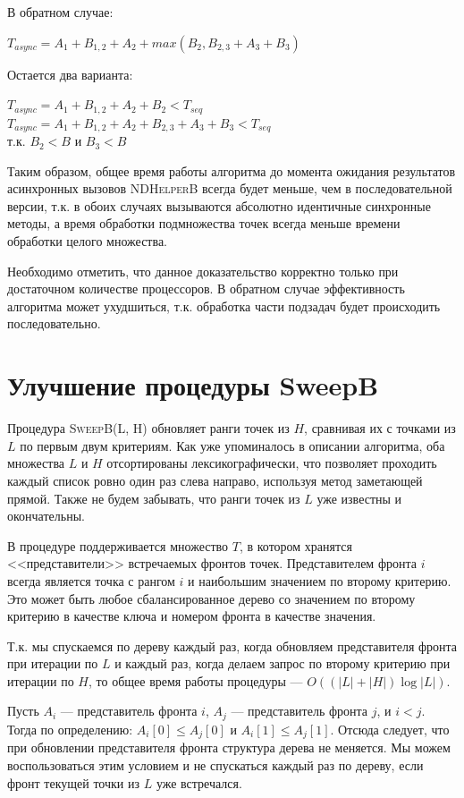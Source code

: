 В обратном случае:
\begin{center}
    $T_{async} = A_1 + B_{1,2} + A_2 + max(B_2, B_{2,3} + A_3 + B_3)$
\end{center}

Остается два варианта:
\begin{center}
    $T_{async} = A_1 + B_{1,2} + A_2 + B_2 < T_{seq}$\\
    $T_{async} = A_1 + B_{1,2} + A_2 + B_{2,3} + A_3 + B_3 < T_{seq}$\\
    т.к. $B_2 < B$ и $B_3 < B$
\end{center}

Таким образом, общее время работы алгоритма до момента ожидания результатов асинхронных вызовов \textsc{NDHelperB} всегда будет меньше, чем в последовательной версии, т.к. в обоих случаях вызываются абсолютно идентичные синхронные методы, а время обработки подмножества точек всегда меньше времени обработки целого множества.

Необходимо отметить, что данное доказательство корректно только при достаточном количестве процессоров.
В обратном случае эффективность алгоритма может ухудшиться, т.к. обработка части подзадач будет происходить последовательно.

\section{Улучшение процедуры SweepB}
Процедура \textsc{SweepB(L, H)} обновляет ранги точек из $H$, сравнивая их с точками из $L$ по первым двум критериям.
Как уже упоминалось в описании алгоритма, оба множества $L$ и $H$ отсортированы лексикографически, что позволяет проходить каждый список ровно один раз слева направо, используя метод заметающей прямой.
Также не будем забывать, что ранги точек из $L$ уже известны и окончательны.

В процедуре поддерживается множество $T$, в котором хранятся <<представители>> встречаемых фронтов точек. Представителем фронта $i$ всегда является точка с рангом $i$ и наибольшим значением по второму критерию. 
Это может быть любое сбалансированное дерево со значением по второму критерию в качестве ключа и номером фронта в качестве значения.

Т.к. мы спускаемся по дереву каждый раз, когда обновляем представителя фронта при итерации по $L$ и каждый раз, когда делаем запрос по второму критерию при итерации по $H$, то общее время работы процедуры --- $O((|L|+|H|)\log{|L|})$.

Пусть $A_i$ --- представитель фронта $i$, $A_j$ --- представитель фронта $j$, и $i < j$.
Тогда по определению: $A_i[0] \leq A_j[0]$ и $A_i[1] \leq A_j[1]$.
Отсюда следует, что при обновлении представителя фронта структура дерева не меняется.
Мы можем воспользоваться этим условием и не спускаться каждый раз по дереву, если фронт текущей точки из $L$ уже встречался.

